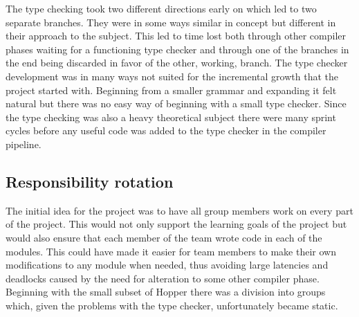The type checking took two different directions early on which led to two separate branches. They were in some ways similar in concept but different in their approach to the subject. This led to time lost both through other compiler phases waiting for a functioning type checker and through one of the branches in the end being discarded in favor of the other, working, branch. The type checker development was in many ways not suited for the incremental growth that the project started with. Beginning from a smaller grammar and expanding it felt natural but there was no easy way of beginning with a small type checker. Since the type checking was also a heavy theoretical subject there were many sprint cycles before any useful code was added to the type checker in the compiler pipeline. 

\subsection{Responsibility rotation}

The initial idea for the project was to have all group members work on every part of the project. This would not only support the learning goals of the project but would also ensure that each member of the team wrote code in each of the modules. This could have made it easier for team members to make their own modifications to any module when needed, thus avoiding large latencies and deadlocks caused by the need for alteration to some other compiler phase. 
Beginning with the small subset of Hopper there was a division into groups which, given the problems with the type checker, unfortunately became static.
